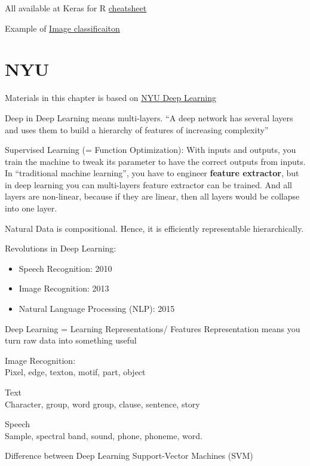 \documentclass[
]{book}
\providecommand{\tightlist}{%
  \setlength{\itemsep}{0pt}\setlength{\parskip}{0pt}}
\begin{document}
All available at Keras for R \href{https://github.com/rstudio/cheatsheets/raw/master/keras.pdf}{cheatsheet}

Example of \href{https://blogs.rstudio.com/ai/posts/2017\%20*12\%20*14\%20*image\%20*classification\%20*on\%20*small\%20*datasets/}{Image classificaiton}

\hypertarget{nyu}{%
\chapter{NYU}\label{nyu}}

Materials in this chapter is based on \href{https://atcold.github.io/pytorch-Deep-Learning/}{NYU Deep Learning}

Deep in Deep Learning means multi-layers. ``A deep network has several layers and uses them to build a hierarchy of features of increasing complexity''

Supervised Learning (= Function Optimization): With inputs and outputs, you train the machine to tweak its parameter to have the correct outputs from inputs. In ``traditional machine learning'', you have to engineer \textbf{feature extractor}, but in deep learning you can multi-layers feature extractor can be trained. And all layers are non-linear, because if they are linear, then all layers would be collapse into one layer.

Natural Data is compositional. Hence, it is efficiently representable hierarchically.

Revolutions in Deep Learning:

\begin{itemize}
\tightlist
\item
  Speech Recognition: 2010
\item
  Image Recognition: 2013
\item
  Natural Language Processing (NLP): 2015
\end{itemize}

Deep Learning = Learning Representations/ Features Representation means you turn raw data into something useful

Image Recognition:\\
Pixel, edge, texton, motif, part, object

Text\\
Character, group, word group, clause, sentence, story

Speech\\
Sample, spectral band, sound, phone, phoneme, word.

Difference between Deep Learning Support-Vector Machines (SVM)
\end{document}
